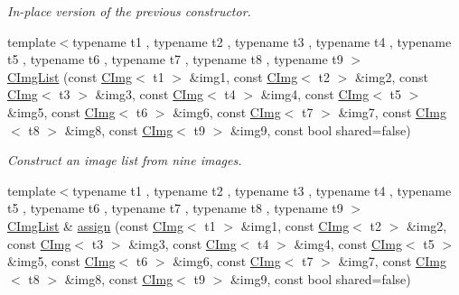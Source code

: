 \begin{DoxyCompactItemize}
\begin{DoxyCompactList}\small\item\em In-\/place version of the previous constructor. \item\end{DoxyCompactList}\item 
\hypertarget{structcimg__library_1_1_c_img_list_a50fbe6797429f5b126efe65136583006}{
{\footnotesize template$<$typename t1 , typename t2 , typename t3 , typename t4 , typename t5 , typename t6 , typename t7 , typename t8 , typename t9 $>$ }\\\hyperlink{structcimg__library_1_1_c_img_list_a50fbe6797429f5b126efe65136583006}{CImgList} (const \hyperlink{structcimg__library_1_1_c_img}{CImg}$<$ t1 $>$ \&img1, const \hyperlink{structcimg__library_1_1_c_img}{CImg}$<$ t2 $>$ \&img2, const \hyperlink{structcimg__library_1_1_c_img}{CImg}$<$ t3 $>$ \&img3, const \hyperlink{structcimg__library_1_1_c_img}{CImg}$<$ t4 $>$ \&img4, const \hyperlink{structcimg__library_1_1_c_img}{CImg}$<$ t5 $>$ \&img5, const \hyperlink{structcimg__library_1_1_c_img}{CImg}$<$ t6 $>$ \&img6, const \hyperlink{structcimg__library_1_1_c_img}{CImg}$<$ t7 $>$ \&img7, const \hyperlink{structcimg__library_1_1_c_img}{CImg}$<$ t8 $>$ \&img8, const \hyperlink{structcimg__library_1_1_c_img}{CImg}$<$ t9 $>$ \&img9, const bool shared=false)}
\label{structcimg__library_1_1_c_img_list_a50fbe6797429f5b126efe65136583006}

\begin{DoxyCompactList}\small\item\em Construct an image list from nine images. \item\end{DoxyCompactList}\item 
\hypertarget{structcimg__library_1_1_c_img_list_ac13c200f47d8fdac4b7d257c9d6d79d6}{
{\footnotesize template$<$typename t1 , typename t2 , typename t3 , typename t4 , typename t5 , typename t6 , typename t7 , typename t8 , typename t9 $>$ }\\\hyperlink{structcimg__library_1_1_c_img_list}{CImgList} \& \hyperlink{structcimg__library_1_1_c_img_list_ac13c200f47d8fdac4b7d257c9d6d79d6}{assign} (const \hyperlink{structcimg__library_1_1_c_img}{CImg}$<$ t1 $>$ \&img1, const \hyperlink{structcimg__library_1_1_c_img}{CImg}$<$ t2 $>$ \&img2, const \hyperlink{structcimg__library_1_1_c_img}{CImg}$<$ t3 $>$ \&img3, const \hyperlink{structcimg__library_1_1_c_img}{CImg}$<$ t4 $>$ \&img4, const \hyperlink{structcimg__library_1_1_c_img}{CImg}$<$ t5 $>$ \&img5, const \hyperlink{structcimg__library_1_1_c_img}{CImg}$<$ t6 $>$ \&img6, const \hyperlink{structcimg__library_1_1_c_img}{CImg}$<$ t7 $>$ \&img7, const \hyperlink{structcimg__library_1_1_c_img}{CImg}$<$ t8 $>$ \&img8, const \hyperlink{structcimg__library_1_1_c_img}{CImg}$<$ t9 $>$ \&img9, const bool shared=false)}
\label{structcimg__library_1_1_c_img_list_ac13c200f47d8fdac4b7d257c9d6d79d6}


\end{DoxyCompactItemize}
